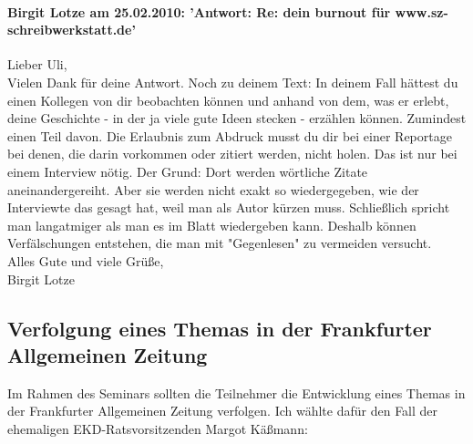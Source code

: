 \documentclass[a4paper,12pt,twoside]{scrbook}
\begin{document}
\paragraph{Birgit Lotze am 25.02.2010: 'Antwort: Re: dein burnout für www.sz-schreibwerkstatt.de'}
Lieber Uli,
\\
Vielen Dank für deine Antwort. Noch zu deinem Text: In deinem Fall hättest du einen Kollegen von dir beobachten können und anhand von dem, was er erlebt, deine Geschichte - in der ja viele gute Ideen stecken - erzählen können. Zumindest einen Teil davon. Die Erlaubnis zum Abdruck musst du dir bei einer Reportage bei denen, die darin vorkommen oder zitiert werden, nicht holen. Das ist nur bei einem Interview nötig. Der Grund:  Dort werden wörtliche Zitate aneinandergereiht. Aber sie werden nicht exakt so wiedergegeben, wie der Interviewte das gesagt hat, weil man als Autor kürzen muss. Schließlich spricht man langatmiger als man es im Blatt wiedergeben kann. Deshalb können Verfälschungen entstehen, die man mit "Gegenlesen" zu vermeiden versucht.
\\
Alles Gute und viele Grüße,
\\
Birgit Lotze

\subsection{Verfolgung eines Themas in der Frankfurter Allgemeinen Zeitung}
Im Rahmen des Seminars sollten die Teilnehmer die Entwicklung eines Themas in der Frankfurter Allgemeinen Zeitung verfolgen.
Ich wählte dafür den Fall der ehemaligen EKD-Ratsvorsitzenden Margot Käßmann:
\end{document}
